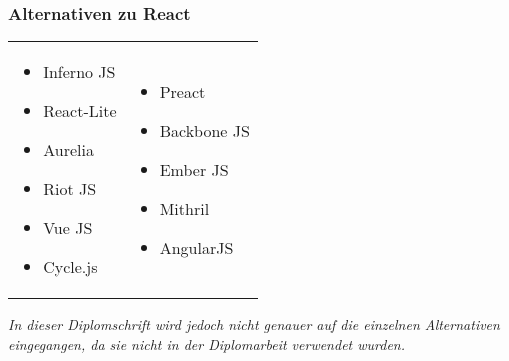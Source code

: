 \subsubsection{Alternativen zu React}
\begin{center}
  \begin{tabular}{ll}
    \parbox{5cm}{
      \begin{itemize}
        \item Inferno JS
        \item React-Lite
        \item Aurelia
        \item Riot JS
        \item Vue JS
        \item Cycle.js
      \end{itemize}}
    &
    \parbox{5cm}{
      \begin{itemize}
        \item Preact
        \item Backbone JS
        \item Ember JS
        \item Mithril
        \item AngularJS
      \end{itemize}}
  \end{tabular} 
\end{center}
\textit{In dieser Diplomschrift wird jedoch nicht genauer auf die einzelnen Alternativen eingegangen, da sie 
nicht in der Diplomarbeit verwendet wurden.}
\pagebreak
